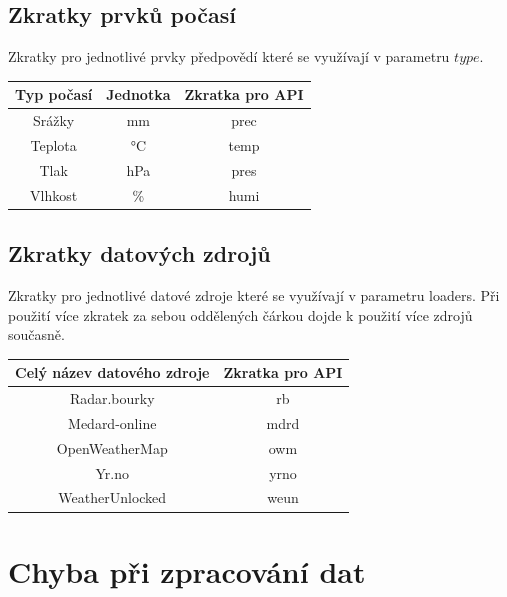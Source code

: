 \documentclass[czech,bachelor,dept460,male,csharp,cpdeclaration]{diploma}
\begin{document}
	\subsection{Zkratky prvků počasí}
	
	Zkratky pro jednotlivé prvky předpovědí které se využívají v parametru $type$.
	
	\begin{center}
		
		
		\begin{tabular}{c c c}
			Typ počasí & Jednotka & Zkratka pro API\\
			\midrule
			Srážky & mm & prec \\
			Teplota & °C & temp \\
			Tlak & hPa & pres \\
			Vlhkost & \% & humi \\
		\end{tabular}
	\end{center}
	
	\subsection{Zkratky datových zdrojů}
	
	Zkratky pro jednotlivé datové zdroje které se využívají v parametru loaders. Při použití více zkratek za sebou oddělených čárkou dojde k použití více zdrojů současně.
	
	\begin{center}
		
		
		\begin{tabular}{c c}
			Celý název datového zdroje & Zkratka pro API\\
			\midrule
			Radar.bourky & rb \\
			Medard-online & mdrd \\
			OpenWeatherMap & owm \\
			Yr.no & yrno \\
			WeatherUnlocked & weun \\
		\end{tabular}
	\end{center}
	
	\section{Chyba při zpracování dat}
	
\end{document}
